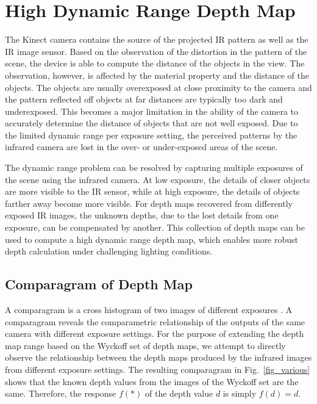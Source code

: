 \section{High Dynamic Range Depth Map}
\label{sec_hdr_depth_map}
The Kinect camera contains the source of the projected IR pattern as well as the IR image sensor. Based on the observation of the distortion in the pattern of the scene, the device is able to compute the distance of the objects in the view. The observation, however, is affected by the material property and the distance of the objects. The objects are usually overexposed at close proximity to the camera and the pattern reflected off  objects at far distances are typically too dark and underexposed. This becomes a major limitation in the ability of the camera to accurately determine the distance of objects that are not well exposed. Due to the limited dynamic range per exposure setting, the perceived patterns by the infrared camera are lost in the over- or under-exposed areas of the scene.

The dynamic range problem can be resolved by capturing multiple exposures of the scene using the infrared camera. At low exposure, the details of closer objects are more visible to the IR sensor, while at high exposure, the details of objects farther away become more visible. For depth maps recovered from differently exposed IR images, the unknown depths, due to the lost details from one exposure, can be compensated by another. This collection of depth maps can be used to compute a high dynamic range depth map, which enables more robust depth calculation under challenging lighting conditions.

\subsection{Comparagram of Depth Map}

A comparagram is a cross histogram of two images of different exposures \cite{mann1994beingundigital}. A comparagram reveals the comparametric relationship of the outputs of the same camera with different exposure settings. For the purpose of extending the depth map range based on the Wyckoff set of depth maps, we attempt to directly observe the relationship between the depth maps produced by the infrared images from different exposure settings. The resulting comparagram in Fig.~\ref{fig_various} shows that the known depth values from the images of the Wyckoff set are the same. Therefore, the response $f(*)$ of the depth value $d$ is simply $f(d) = d$.

